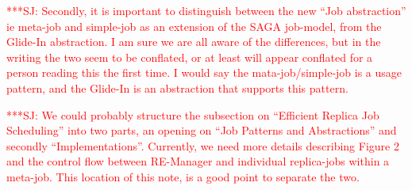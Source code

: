 \documentclass{rspublic}
\newcommand{\alnote}[1]{ {\textcolor{blue} { ***AL: #1 }}}
\newcommand{\jhanote}[1]{ {\textcolor{red} { ***SJ: #1 }}}
\newcommand{\alnote}[1]{}
\newcommand{\jhanote}[1]{}
\newcommand{\glidein}[1]{Glide-In }
\newcommand{\remanager}[1]{RE-Manager }
\begin{document}

\jhanote{Secondly, it is important to distinguish between the new
  ``Job abstraction'' ie meta-job and simple-job as an extension of
  the SAGA job-model, from the \glidein\ abstraction. I am sure we are
  all aware of the differences, but in the writing the two seem to be
  conflated, or at least will appear conflated for a person reading
  this the first time. I would say the mata-job/simple-job is a usage
  pattern, and the \glidein\ is an abstraction that supports this
  pattern.}

\jhanote{We could probably structure the subsection on ``Efficient
  Replica Job Scheduling'' into two parts, an opening on ``Job
  Patterns and Abstractions'' and secondly
  ``Implementations''. Currently, we need more details describing
  Figure 2 and the control flow between \remanager\ and individual
  replica-jobs within a meta-job. This location of this note, is a
  good point to separate the two.}    



  
  
\end{document}
